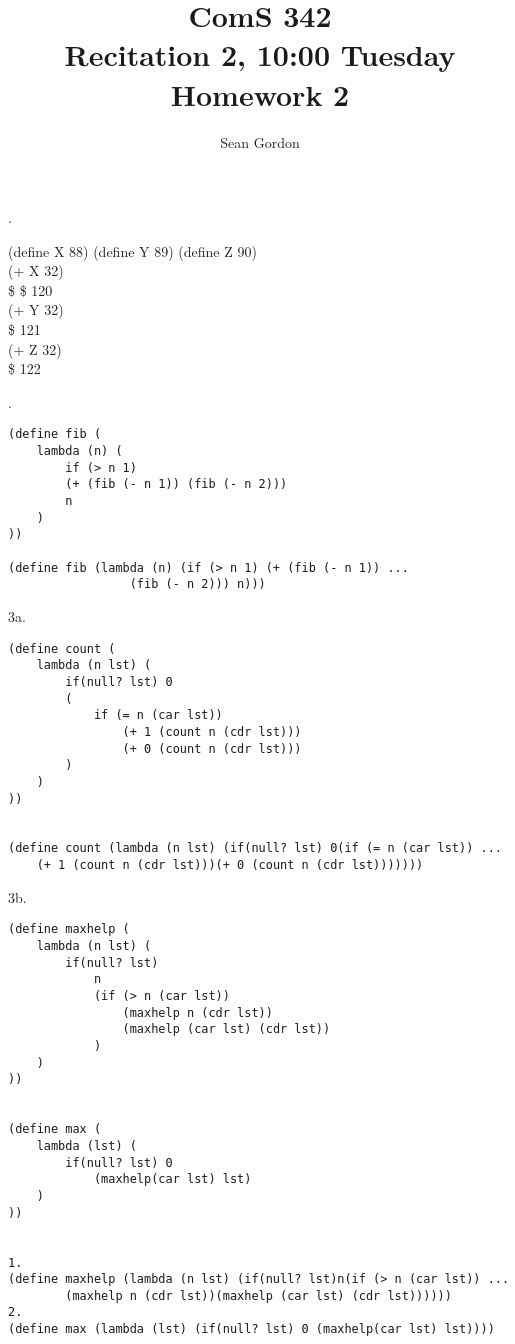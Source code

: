 \documentclass[12pt]{article}
\title{ComS 342\\Recitation 2, 10:00 Tuesday\\Homework 2}
\author{Sean Gordon}
\begin{document}
\maketitle


.
\begin{adjustwidth}{.25in}{0in}
(define X 88) (define Y 89) (define Z 90)\\
(+ X 32)\\
\$ \$ 120\\
(+ Y 32)\\
\$ 121\\
(+ Z 32)\\
\$ 122\\

\end{adjustwidth}

.
\begin{lstlisting}
(define fib (
	lambda (n) (
		if (> n 1) 
		(+ (fib (- n 1)) (fib (- n 2))) 
		n
	)
))

(define fib (lambda (n) (if (> n 1) (+ (fib (- n 1)) ...
				 (fib (- n 2))) n)))

\end{lstlisting}

\pagebreak


\noindent 3a.
\begin{lstlisting}
(define count (
	lambda (n lst) (
		if(null? lst) 0
		(
			if (= n (car lst)) 
				(+ 1 (count n (cdr lst)))
				(+ 0 (count n (cdr lst)))
		)
	)
))


(define count (lambda (n lst) (if(null? lst) 0(if (= n (car lst)) ...
	(+ 1 (count n (cdr lst)))(+ 0 (count n (cdr lst)))))))

\end{lstlisting}

\pagebreak

\noindent 3b.
\begin{lstlisting}
(define maxhelp (
	lambda (n lst) (
		if(null? lst)
			n
			(if (> n (car lst)) 
				(maxhelp n (cdr lst))
				(maxhelp (car lst) (cdr lst))
			)
	)
))


(define max (
	lambda (lst) (
		if(null? lst) 0 
			(maxhelp(car lst) lst)
	)
))


1.
(define maxhelp (lambda (n lst) (if(null? lst)n(if (> n (car lst)) ...
		(maxhelp n (cdr lst))(maxhelp (car lst) (cdr lst))))))
2.
(define max (lambda (lst) (if(null? lst) 0 (maxhelp(car lst) lst))))
\end{lstlisting}

\pagebreak
\end{document}
